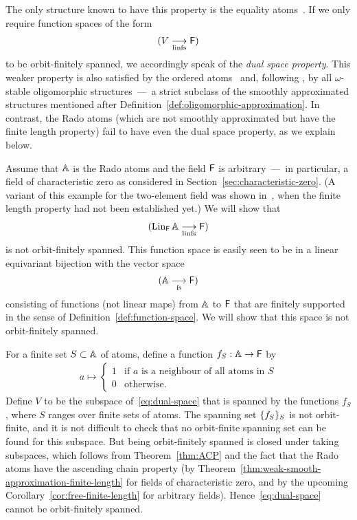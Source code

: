 The only structure known to have this property is the equality atoms~\cite[Thm.~8.16]{bojanczyk_slightly}.
If we only require function spaces of the form \[
    (V \underset{\textup{linfs}}{\longrightarrow} \mathsf{F})
\] to be orbit-finitely spanned, we accordingly speak of the \emph{dual space property}. 
This weaker property is also satisfied by the ordered atoms~\cite[Cor.~6.8]{BFKM24} and, following \cite[Thm.~3.7]{Przybylek_2024}, by all $\omega$-stable oligomorphic structures~---~a strict subclass \cite[p.~440]{KLM89} of the smoothly approximated structures mentioned after Definition~\ref{def:oligomorphic-approximation}.
In contrast, the Rado atoms (which are not smoothly approximated but have the finite length property) fail to have even the dual space property, as we explain below.


\begin{example}\label{ex:no-function-spaces}
    Assume that $\mathbb{A}$ is the Rado atoms and the field $\mathsf{F}$ is arbitrary~---~in particular, a field of characteristic zero as considered in Section~\ref{sec:characteristic-zero}.
    (A variant of this example for the two-element field was shown in~\cite[Ex.~6.9]{BFKM24}, when the finite length property had not been established yet.)
    We will show that
    \[
        (\operatorname{Lin}_{\mathsf{F}} \mathbb{A} \underset{\textup{linfs}}{\longrightarrow} \mathsf{F})
    \]
    is not orbit-finitely spanned.
    This function space is easily seen to be in a linear equivariant bijection with the vector space
    \begin{align}\label{eq:dual-space}
        (\mathbb{A} \underset{\textup{fs}}{\longrightarrow} \mathsf{F})
    \end{align}
    consisting of functions (not linear maps) from $\mathbb{A}$ to $\mathsf{F}$ that are finitely supported in the sense of Definition~\ref{def:function-space}.
    We will show that this space is not orbit-finitely spanned.
    
    For a finite set $S \subset \mathbb{A}$ of atoms, define a function $f_S : \mathbb{A} \to \mathsf{F}$ by
    \begin{align*}
        a \mapsto
        \begin{cases}
            1 & \text{if $a$ is a neighbour of all atoms in $S$}\\
            0 & \text{otherwise}.
        \end{cases}
    \end{align*}
    Define $V$ to be the subspace of~\eqref{eq:dual-space} that is spanned by the functions $f_S$, where $S$ ranges over finite sets of atoms.
    The spanning set $\{f_S\}_S$ is not orbit-finite, and %
    it is not difficult to check that no orbit-finite spanning set can be found for this subspace.  
    But being orbit-finitely spanned is closed under taking subspaces, which follows from Theorem~\ref{thm:ACP} and the fact that the Rado atoms have the ascending chain property
    (by Theorem~\ref{thm:weak-smooth-approximation-finite-length} for fields of characteristic zero, and by the upcoming Corollary~\ref{cor:free-finite-length} for arbitrary fields). 
    Hence~\eqref{eq:dual-space} cannot be orbit-finitely spanned. 
\lipicsEnd\end{example}
 



